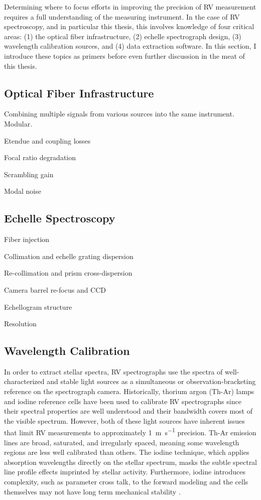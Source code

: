 Determining where to focus efforts in improving the precision of RV measurement requires a full understanding of the measuring instrument. In the case of RV spectroscopy, and in particular this thesis, this involves knowledge of four critical areas: (1) the optical fiber infrastructure, (2) echelle spectrograph design, (3) wavelength calibration sources, and (4) data extraction software. In this section, I introduce these topics as primers before even further discussion in the meat of this thesis.

\subsection{Optical Fiber Infrastructure} \label{intro:optics:fiber}



Combining multiple signals from various sources into the same instrument. Modular.

Etendue and coupling losses

Focal ratio degradation

Scrambling gain

Modal noise

\subsection{Echelle Spectroscopy} \label{intro:optics:echelle}

Fiber injection

Collimation and echelle grating dispersion

Re-collimation and prism cross-dispersion

Camera barrel re-focus and CCD

Echellogram structure

Resolution

\subsection{Wavelength Calibration} \label{intro:wvln_cal}

In order to extract stellar spectra, RV spectrographs use the spectra of well-characterized and stable light sources as a simultaneous or observation-bracketing reference on the spectrograph camera. Historically, thorium argon (Th-Ar) lamps and iodine reference cells have been used to calibrate RV spectrographs since their spectral properties are well understood and their bandwidth covers most of the visible spectrum. However, both of these light sources have inherent issues that limit RV measurements to approximately \SI{1}{\meter\per\second} precision. Th-Ar emission lines are broad, saturated, and irregularly spaced, meaning some wavelength regions are less well calibrated than others. The iodine technique, which applies absorption wavelengths directly on the stellar spectrum, masks the subtle spectral line profile effects imprinted by stellar activity. Furthermore, iodine introduces complexity, such as parameter cross talk, to the forward modeling \citep{spronck_fiber_2015} and the cells themselves may not have long term mechanical stability \citep{fischer_twenty-five_2014}.

